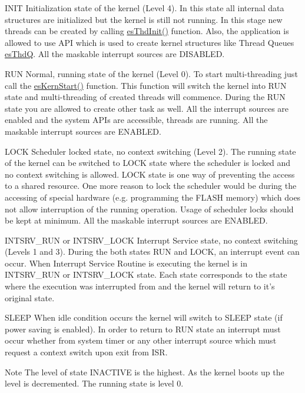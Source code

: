 \begin{DoxyParagraph}{I\-N\-I\-T}
Initialization state of the kernel (Level 4). In this state all internal data structures are initialized but the kernel is still not running. In this stage new threads can be created by calling \hyperlink{group__kern__intf_gac91734f3ee867b519f59bf81cc7fde88}{es\-Thd\-Init()} function. Also, the application is allowed to use A\-P\-I which is used to create kernel structures like Thread Queues \hyperlink{structesThdQ}{es\-Thd\-Q}. All the maskable interrupt sources are D\-I\-S\-A\-B\-L\-E\-D.
\end{DoxyParagraph}
\begin{DoxyParagraph}{R\-U\-N}
Normal, running state of the kernel (Level 0). To start multi-\/threading just call the \hyperlink{group__kern__intf_ga0e7a0a6b9c02df58de0f98de0229a09d}{es\-Kern\-Start()} function. This function will switch the kernel into {\ttfamily R\-U\-N} state and multi-\/threading of created threads will commence. During the {\ttfamily R\-U\-N} state you are allowed to create other task as well. All the interrupt sources are enabled and the system A\-P\-Is are accessible, threads are running. All the maskable interrupt sources are E\-N\-A\-B\-L\-E\-D.
\end{DoxyParagraph}
\begin{DoxyParagraph}{L\-O\-C\-K}
Scheduler locked state, no context switching (Level 2). The running state of the kernel can be switched to {\ttfamily L\-O\-C\-K} state where the scheduler is locked and no context switching is allowed. {\ttfamily L\-O\-C\-K} state is one way of preventing the access to a shared resource. One more reason to lock the scheduler would be during the accessing of special hardware (e.\-g. programming the F\-L\-A\-S\-H memory) which does not allow interruption of the running operation. Usage of scheduler locks should be kept at minimum. All the maskable interrupt sources are E\-N\-A\-B\-L\-E\-D.
\end{DoxyParagraph}
\begin{DoxyParagraph}{I\-N\-T\-S\-R\-V\-\_\-\-R\-U\-N or I\-N\-T\-S\-R\-V\-\_\-\-L\-O\-C\-K}
Interrupt Service state, no context switching (Levels 1 and 3). During the both states {\ttfamily R\-U\-N} and {\ttfamily L\-O\-C\-K}, an interrupt event can occur. When Interrupt Service Routine is executing the kernel is in {\ttfamily I\-N\-T\-S\-R\-V\-\_\-\-R\-U\-N} or {\ttfamily I\-N\-T\-S\-R\-V\-\_\-\-L\-O\-C\-K} state. Each state corresponds to the state where the execution was interrupted from and the kernel will return to it's original state.
\end{DoxyParagraph}
\begin{DoxyParagraph}{S\-L\-E\-E\-P}
When idle condition occurs the kernel will switch to {\ttfamily S\-L\-E\-E\-P} state (if power saving is enabled). In order to return to {\ttfamily R\-U\-N} state an interrupt must occur whether from system timer or any other interrupt source which must request a context switch upon exit from I\-S\-R.
\end{DoxyParagraph}
\begin{DoxyNote}{Note}
The level of state {\ttfamily I\-N\-A\-C\-T\-I\-V\-E} is the highest. As the kernel boots up the level is decremented. The running state is level 0. 
\end{DoxyNote}
